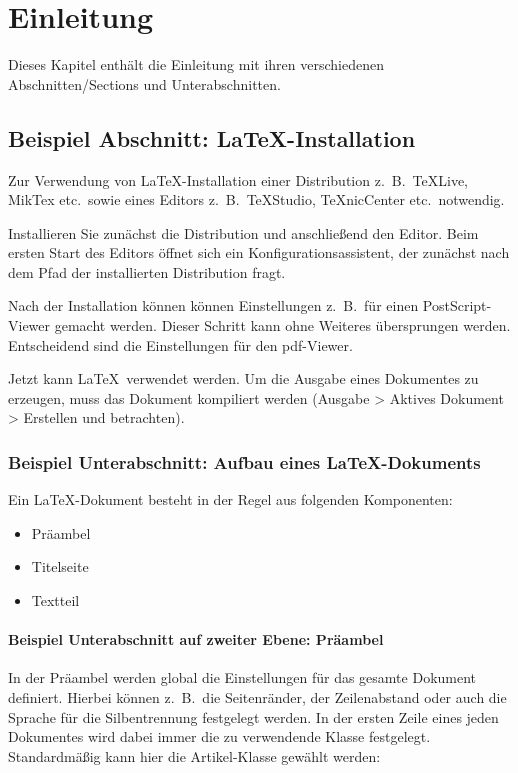 \chapter{Einleitung}

\nocite{*}

Dieses Kapitel enthält die Einleitung mit ihren verschiedenen Abschnitten/Sections und Unterabschnitten.

\section{Beispiel Abschnitt: \LaTeX-Installation}

Zur Verwendung von \LaTeX-Installation einer Distribution z.~B.~TeXLive, MikTex etc.~sowie eines Editors z.~B.~TeXStudio, TeXnicCenter etc.~notwendig.

Installieren Sie zun\"achst die Distribution und anschließend den Editor. Beim ersten Start des Editors \"offnet sich ein 
Konfigurationsassistent, der zun\"achst nach dem Pfad der installierten Distribution fragt. 

Nach der Installation können k\"onnen Einstellungen z.~B.~f\"ur einen PostScript-Viewer gemacht werden. 
Dieser Schritt kann ohne Weiteres \"ubersprungen werden. Entscheidend sind die Einstellungen f\"ur den pdf-Viewer. 

Jetzt kann \LaTeX~verwendet werden. Um die Ausgabe eines Dokumentes zu erzeugen, muss das Dokument kompiliert werden (Ausgabe >
Aktives Dokument > Erstellen und betrachten).

\subsection{Beispiel Unterabschnitt: Aufbau eines \LaTeX-Dokuments}

Ein \LaTeX-Dokument besteht in der Regel aus folgenden Komponenten:
\begin{itemize}
	\item Pr\"aambel
	\item Titelseite
	\item Textteil
\end{itemize}

\subsubsection{Beispiel Unterabschnitt auf zweiter Ebene: Pr\"aambel}
In der Pr\"aambel werden global die Einstellungen f\"ur das gesamte Dokument definiert. Hierbei k\"onnen z.~B.~die Seitenr\"ander, 
der Zeilenabstand oder auch die Sprache f\"ur die Silbentrennung festgelegt werden. In der ersten Zeile eines jeden Dokumentes wird dabei
immer die zu verwendende Klasse festgelegt. Standardm\"aßig kann hier die Artikel-Klasse gew\"ahlt werden:

